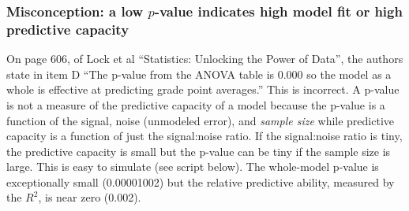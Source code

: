 \documentclass[]{book}
\newenvironment{Shaded}{\begin{snugshade}}{\end{snugshade}}
\newcommand{\DataTypeTok}[1]{\textcolor[rgb]{0.13,0.29,0.53}{#1}}
\newcommand{\DecValTok}[1]{\textcolor[rgb]{0.00,0.00,0.81}{#1}}
\newcommand{\FloatTok}[1]{\textcolor[rgb]{0.00,0.00,0.81}{#1}}
\newcommand{\KeywordTok}[1]{\textcolor[rgb]{0.13,0.29,0.53}{\textbf{#1}}}
\newcommand{\NormalTok}[1]{#1}
\newcommand{\OperatorTok}[1]{\textcolor[rgb]{0.81,0.36,0.00}{\textbf{#1}}}
\newcommand{\StringTok}[1]{\textcolor[rgb]{0.31,0.60,0.02}{#1}}
\begin{document}
\hypertarget{misconception-a-low-p-value-indicates-high-model-fit-or-high-predictive-capacity}{%
\subsubsection{\texorpdfstring{Misconception: a low \(p\)-value indicates high model fit or high predictive capacity}{Misconception: a low p-value indicates high model fit or high predictive capacity}}\label{misconception-a-low-p-value-indicates-high-model-fit-or-high-predictive-capacity}}

On page 606, of Lock et al ``Statistics: Unlocking the Power of Data'', the authors state in item D ``The p-value from the ANOVA table is 0.000 so the model as a whole is effective at predicting grade point averages.'' This is incorrect. A p-value is not a measure of the predictive capacity of a model because the p-value is a function of the signal, noise (unmodeled error), and \emph{sample size} while predictive capacity is a function of just the signal:noise ratio. If the signal:noise ratio is tiny, the predictive capacity is small but the p-value can be tiny if the sample size is large. This is easy to simulate (see script below). The whole-model p-value is exceptionally small (0.00001002) but the relative predictive ability, measured by the \(R^2\), is near zero (0.002).

\begin{Shaded}
\end{Shaded}
\end{document}
